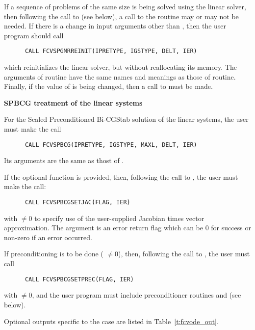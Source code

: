 \begin{Steps}
  If a sequence of problems of the same size is being solved using the {\spgmr}
  linear solver, then following the call to  (see below), a call
  to the  routine may or may not be needed.  
  If there is a change in input arguments other than , then the user 
  program should call
\begin{verbatim}
      CALL FCVSPGMRREINIT(IPRETYPE, IGSTYPE, DELT, IER)
\end{verbatim}
  which reinitializes the {\spgmr} linear solver, but without reallocating its memory.
  The arguments of  routine have the same names and meanings
  as those of  routine.  Finally, if the value of  is
  being changed, then a call to  must be made.

  
  {\s}{\p} {\bf SPBCG treatment of the linear systems}
  
  For the Scaled Preconditioned Bi-CGStab solution of the linear systems,
  the user must make the call
\begin{verbatim}
      CALL FCVSPBCG(IPRETYPE, IGSTYPE, MAXL, DELT, IER)
\end{verbatim}
  Its arguments are the same as thost of .

  If the optional function  is provided, then, following the call to
  , the user must make the call:
\begin{verbatim}
      CALL FCVSPBCGSETJAC(FLAG, IER)
\end{verbatim}
  with  $\neq 0$ to specify use of the user-supplied Jacobian times
  vector approximation.
  The argument  is an error return flag which can be $0$ 
  for success or non-zero if an error occurred.
  
  If preconditioning is to be done ( $\neq 0$), then, following the
  call to , the user must call
\begin{verbatim}
      CALL FCVSPBCGSETPREC(FLAG, IER)
\end{verbatim}
  with  $\neq 0$, and the user program must include preconditioner routines
   and  (see below).

  Optional outputs specific to the {\spbcg} case are listed in Table~\ref{t:fcvode_out}.
  

\end{Steps}
